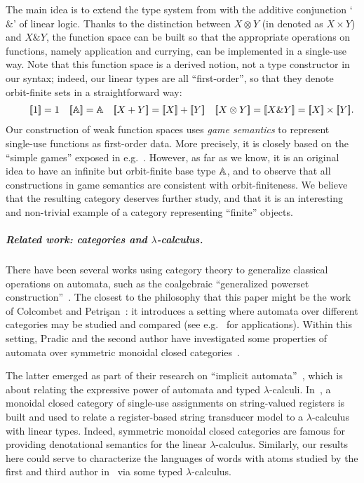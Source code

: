 \documentclass[a4paper,UKenglish,cleveref, autoref, thm-restate]{lipics-v2021}
\begin{document}
The main idea is to extend the type system from \cite{stefanski-phd} with the additive conjunction `$\&$' of linear logic. Thanks to the distinction between $X \otimes Y$ (in \cite{stefanski-phd} denoted as $X \times Y$) and $X \& Y$, the function space can be built so that the appropriate operations on functions, namely application and currying, can be implemented in a single-use way. Note that this function space is a derived notion, not a type constructor in our syntax; indeed, our linear types are all ``first-order'', so that they denote orbit-finite sets in a straightforward way:
\begin{align*}
    \qquad \sem{1} = 1
\quad
\sem{\atoms} = \atoms
\quad
\sem{X+Y} = \sem X + \sem Y
\quad
\sem{X \otimes Y} =
\sem{X \& Y} = \sem X \times \sem Y.
\end{align*}
Our construction of weak function spaces uses \emph{game semantics} to represent single-use functions as first-order data. More precisely, it is closely based on the ``simple games'' exposed in e.g.~\cite{abramsky2013semantics,Hyland1997}. However, as far as we know, it is an original idea to have an infinite but orbit-finite base type $\mathbb A$, and to observe that all constructions in game semantics are consistent with orbit-finiteness. We believe that the resulting category deserves further study, and that it is an interesting and non-trivial example of a category representing ``finite'' objects.

\subparagraph{Related work: categories and $\lambda$-calculus.}

There have been several works using category theory to generalize classical operations on automata, such as the coalgebraic ``generalized powerset construction''~\cite{DBLP:journals/corr/abs-1302-1046}. The closest to the philosophy that this paper might be the work of Colcombet and Petrişan~\cite{colcombet2020automata}: it introduces a setting where automata over different categories may be studied and compared (see e.g.~\cite{Aristote24} for applications). Within this setting, Pradic and the second author have investigated some properties of automata over symmetric monoidal closed categories~\cite[Sections~1.2.3~and~4.7--4.8]{titoPhD}.

The latter emerged as part of their research on ``implicit automata''~\cite{IATLC,titoPhD,pradic2024implicit}, which is about relating the expressive power of automata and typed $\lambda$-calculi. In~\cite[Chapter~4]{titoPhD}, a monoidal closed category of single-use assignments on string-valued registers is built and used to relate a register-based string transducer model to a $\lambda$-calculus with linear types. Indeed, symmetric monoidal closed categories are famous for providing denotational semantics for the linear $\lambda$-calculus. Similarly, our results here could serve to characterize the languages of words with atoms studied by the first and third author in~\cite{bojanczykstefanski2020} via some typed $\lambda$-calculus.
\end{document}
